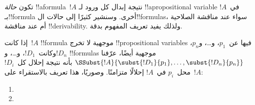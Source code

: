 \documentclass[../../../include/open-logic-section]{subfiles}
\begin{document}


تكون \emph{حالة} !!a{formula}~$!A$ نتيجة إبدال كل ورود لـ
!!a{propositional variable} في~$!A$ بـ!!{formula} أخرى. وسنشير كثيرًا
إلى حالات ال!!{formula}s، سواء عند مناقشة الصلاحية أم عند مناقشة
!!{derivability}. ولذلك يفيد تعريف المفهوم بدقة.

\begin{defn}
  إذا كانت~$!A$ !!{formula} موجهية لا تخرج !!{propositional
    variable}s فيها عن~$p_1$، و\dots، و$p_n$، وكانت~$!D_1$، و\dots،
  و$!D_n$ !!{formula}s موجهية أيضًا، عرّفنا
  $\SSubst{!A}{\subst{!D_1}{p_1}, \dots, \subst{!D_n}{p_n}}$ بأنه
  نتيجة إحلال كل~$!D_i$ محل~$p_i$ في~$!A$ إحلالًا متزامنًا. وصوريًا،
  هذا تعريف بالاستقراء على~$!A$:
  \begin{enumerate}
    \item {}
    \item {}
\end{enumerate}
\end{defn}
\end{document}
